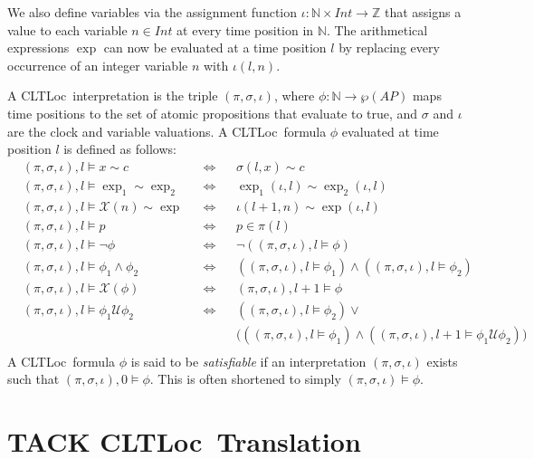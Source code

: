 \documentclass[a4paper,11pt]{report}
\theoremstyle{definition}
\newcommand{\cltloc}{CLTLoc}
\begin{document}
We also define variables via the assignment function
$\iota : \mathbb{N} \times Int \rightarrow \mathbb{Z}$ that assigns a value to
each variable $n \in Int$ at every time position in $\mathbb{N}$. The
arithmetical expressions $\exp$ can now be evaluated at a time position $l$ by
replacing every occurrence of an integer variable $n$ with $\iota(l,n)$.

A \cltloc\ interpretation is the triple $(\pi, \sigma, \iota)$, where
$\phi: \mathbb{N} \rightarrow \wp(AP)$ maps time positions to the set of atomic
propositions that evaluate to true, and $\sigma$ and $\iota$ are the clock and
variable valuations. A \cltloc\ formula $\phi$ evaluated at time position $l$ is
defined as follows:
\begin{align*}
  &(\pi,\sigma,\iota),l \vDash x \sim c && \Leftrightarrow && \sigma(l,x) \sim c \\
  &(\pi,\sigma,\iota),l \vDash \exp_{1} \sim \exp_{2} && \Leftrightarrow && \exp_{1}(\iota,l) \sim \exp_{2}(\iota,l) \\
  &(\pi,\sigma,\iota),l \vDash \mathcal{X}(n) \sim \exp && \Leftrightarrow && \iota(l{+}1,n) \sim \exp(\iota,l) \\
  &(\pi,\sigma,\iota),l \vDash p && \Leftrightarrow && p \in \pi(l) \\
  &(\pi,\sigma,\iota),l \vDash \neg \phi && \Leftrightarrow && \neg ((\pi,\sigma,\iota),l \vDash \phi) \\
  &(\pi,\sigma,\iota),l \vDash \phi_{1} \land \phi_{2} && \Leftrightarrow &&((\pi,\sigma,\iota),l \vDash \phi_{1}) \land ((\pi,\sigma,\iota),l \vDash \phi_{2}) \\
  &(\pi,\sigma,\iota),l \vDash \mathcal{X}(\phi) && \Leftrightarrow && (\pi,\sigma,\iota),l{+}1 \vDash \phi \\
  &(\pi,\sigma,\iota),l \vDash \phi_{1} \mathcal{U} \phi_{2} && \Leftrightarrow &&((\pi,\sigma,\iota),l \vDash \phi_{2}) \lor \\
  &&&&& \bigg(((\pi,\sigma,\iota),l \vDash \phi_{1}) \land ((\pi,\sigma,\iota),l{+}1 \vDash \phi_{1} \mathcal{U} \phi_{2}) \bigg) \\
\end{align*}
A \cltloc\ formula $\phi$ is said to be \emph{satisfiable} if an interpretation
$(\pi,\sigma,\iota)$ exists such that $(\pi,\sigma,\iota),0 \vDash \phi$. This
is often shortened to simply $(\pi,\sigma,\iota) \vDash \phi$.


\section{TACK \cltloc\ Translation}\label{prelim-tack}
\end{document}
